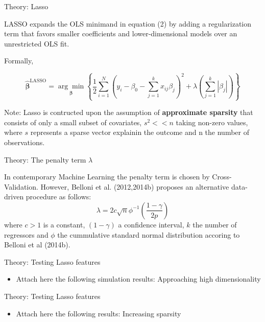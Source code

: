 \documentclass{beamer}
\begin{document}
\begin{frame}{Theory: Lasso}
\begin{flushleft}
LASSO expands the OLS minimand in equation (2) by adding a regularization term  
that favors smaller coefficients and lower-dimensional models over an unrestricted OLS fit.

Formally, 
\end{flushleft}
	\[
	\hat{\boldsymbol{\beta}}^{\text{LASSO}} =\underset{\boldsymbol{\beta}}{\arg \min}\left\{\frac{1}{2}\sum_{i=1}^N (y_i-\beta_0-\sum_{j=1}^k x_{i j}\beta_j)^2 +\lambda \left(\sum_{j=1}^k |\beta_j|\right)\right\}
	\tag{3}
	\]

\begin{flushleft}
Note: Lasso is contructed upon the assumption of \textbf{approximate sparsity} that consists of only a small subset of covariates, $s^2<<n$ taking non-zero values, where $s$ represents
a sparse vector explainin the outcome and n the number of observations.
\end{flushleft}
\end{frame}


\begin{frame}{Theory: The penalty term $\lambda$}
	\begin{flushleft}
	In contemporary Machine Learning the penalty term is chosen by Cross-Validation. However, 
	Belloni et al. (2012,2014b) proposes an alternative data-driven procedure as follows:
	\[
	\lambda=2c \sqrt{n} \phi^{-1} (\frac{1-\gamma}{2p})
		\tag{4}
	\]
	where $c>1$ is a constant, $(1-\gamma)$ a confidence interval, $k$ the number of regressors and $\phi$ the cummulative standard normal distribution
	accoring to Belloni et al (2014b).
	\end{flushleft}
\end{frame}


\begin{frame}{Theory: Testing Lasso features}
	\begin{itemize}
		\item Attach here the following simulation results: Approaching high dimensionality
	\end{itemize}
\end{frame}


\begin{frame}{Theory: Testing Lasso features}
	\begin{itemize}
		\item Attach here the following results: Increasing sparsity
	\end{itemize}
\end{frame}
\end{document}
